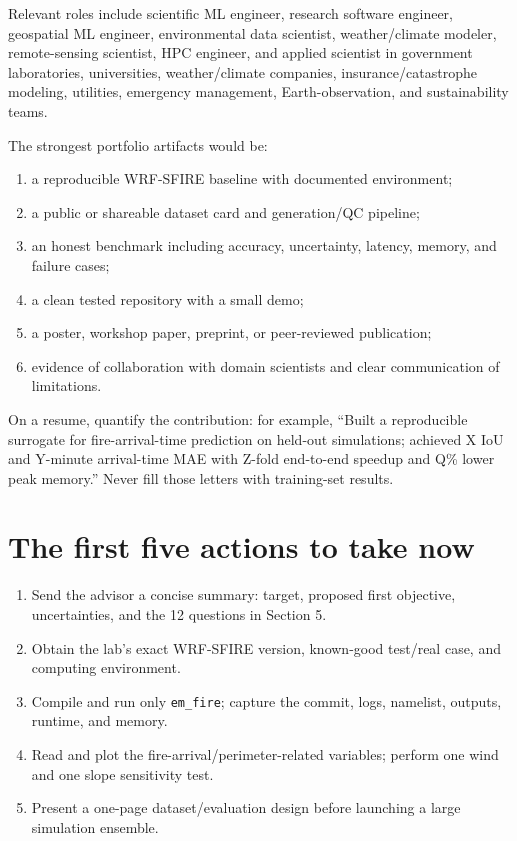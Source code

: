 \documentclass[11pt]{article}
\begin{document}
Relevant roles include scientific ML engineer, research software engineer, geospatial ML engineer, environmental data scientist, weather/climate modeler, remote-sensing scientist, HPC engineer, and applied scientist in government laboratories, universities, weather/climate companies, insurance/catastrophe modeling, utilities, emergency management, Earth-observation, and sustainability teams.

The strongest portfolio artifacts would be:
\begin{enumerate}
  \item a reproducible WRF-SFIRE baseline with documented environment;
  \item a public or shareable dataset card and generation/QC pipeline;
  \item an honest benchmark including accuracy, uncertainty, latency, memory, and failure cases;
  \item a clean tested repository with a small demo;
  \item a poster, workshop paper, preprint, or peer-reviewed publication;
  \item evidence of collaboration with domain scientists and clear communication of limitations.
\end{enumerate}

On a resume, quantify the contribution: for example, ``Built a reproducible surrogate for fire-arrival-time prediction on held-out simulations; achieved X IoU and Y-minute arrival-time MAE with Z-fold end-to-end speedup and Q\% lower peak memory.'' Never fill those letters with training-set results.

\section{The first five actions to take now}

\begin{enumerate}
  \item Send the advisor a concise summary: target, proposed first objective, uncertainties, and the 12 questions in Section 5.
  \item Obtain the lab's exact WRF-SFIRE version, known-good test/real case, and computing environment.
  \item Compile and run only \texttt{em\_fire}; capture the commit, logs, namelist, outputs, runtime, and memory.
  \item Read and plot the fire-arrival/perimeter-related variables; perform one wind and one slope sensitivity test.
  \item Present a one-page dataset/evaluation design before launching a large simulation ensemble.
\end{enumerate}
\end{document}
